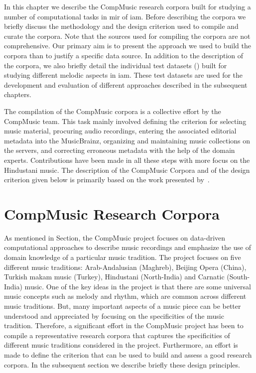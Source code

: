 In this chapter we describe the CompMusic research corpora built for studying a number of computational tasks in \gls{mir} of \gls{iam}. Before describing the corpora we briefly discuss the methodology and the design criterion used to compile and curate the corpora. Note that the sources used for compiling the corpora are not comprehensive. Our primary aim is to present the approach we used to build the corpora than to justify a specific data source. In addition to the description of the corpora, we also briefly detail the individual test datasets () built for studying different melodic aspects in \gls{iam}. These test datasets are used for the development and evaluation of different approaches described in the subsequent chapters. 

The compilation of the CompMusic corpora is a collective effort by the CompMusic team. This task mainly involved defining the criterion for selecting music material, procuring audio recordings, entering the associated editorial metadata into the MusicBrainz, organizing and maintaining music collections on the servers, and correcting erroneous metadata with the help of the domain experts. Contributions have been made in all these steps with more focus on the Hindustani music. The description of the CompMusic Corpora and of the design criterion given below is primarily based on the work presented by~\cite{CM_Corpora_Ajay14,serra:14:corpus}.


\section{CompMusic Research Corpora}
\label{sec:corpus_compmusic_research_corpora}

As mentioned in Section, the CompMusic project focuses on data-driven computational approaches to describe music recordings and emphasize the use of domain knowledge of a particular music tradition. The project focuses on five different music traditions: Arab-Andalusian (Maghreb), Beijing Opera (China), Turkish makam music (Turkey), Hindustani (North-India) and Carnatic (South-India) music. One of the key ideas in the project is that there are some universal music concepts such as melody and rhythm, which are common across different music traditions. But, many important aspects of a music piece can be better understood and appreciated by focusing on the specificities of the music tradition. Therefore, a significant effort in the CompMusic project has been to compile a representative research corpora that captures the specificities of different music traditions considered in the project. Furthermore, an effort is made to define the criterion that can be used to build and assess a good research corpora. In the subsequent section we describe briefly these design principles.

